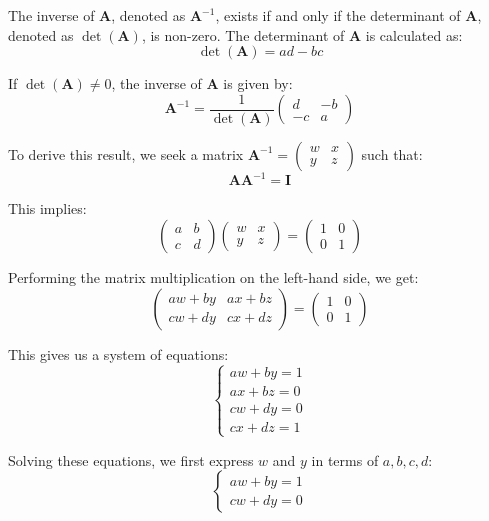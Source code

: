 \documentclass[a4paper,12pt]{article}
\begin{document}
\begin{itemize}[leftmargin=*]
The inverse of \( \mathbf{A} \), denoted as \( \mathbf{A}^{-1} \), exists if and only if the determinant of \( \mathbf{A} \), denoted as \( \det(\mathbf{A}) \), is non-zero. The determinant of \( \mathbf{A} \) is calculated as:
\[
\det(\mathbf{A}) = ad - bc
\]

If \( \det(\mathbf{A}) \neq 0 \), the inverse of \( \mathbf{A} \) is given by:
\[
\mathbf{A}^{-1} = \frac{1}{\det(\mathbf{A})} \begin{pmatrix}
d & -b \\
-c & a
\end{pmatrix}
\]

To derive this result, we seek a matrix \( \mathbf{A}^{-1} = \begin{pmatrix}
w & x \\
y & z
\end{pmatrix} \) such that:
\[
\mathbf{A} \mathbf{A}^{-1} = \mathbf{I}
\]

This implies:
\[
\begin{pmatrix}
a & b \\
c & d
\end{pmatrix}
\begin{pmatrix}
w & x \\
y & z
\end{pmatrix}
=
\begin{pmatrix}
1 & 0 \\
0 & 1
\end{pmatrix}
\]

Performing the matrix multiplication on the left-hand side, we get:
\[
\begin{pmatrix}
aw + by & ax + bz \\
cw + dy & cx + dz
\end{pmatrix}
=
\begin{pmatrix}
1 & 0 \\
0 & 1
\end{pmatrix}
\]

This gives us a system of equations:
\[
\begin{cases}
aw + by = 1 \\
ax + bz = 0 \\
cw + dy = 0 \\
cx + dz = 1
\end{cases}
\]

Solving these equations, we first express \( w \) and \( y \) in terms of \( a, b, c, d \):
\[
\begin{cases}
aw + by = 1 \\
cw + dy = 0
\end{cases}
\]


\end{itemize}
\end{document}
